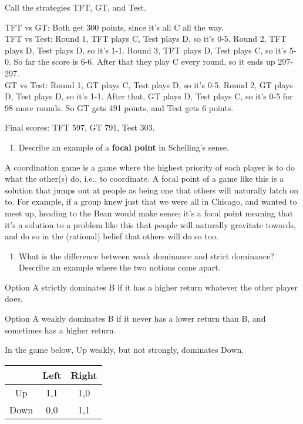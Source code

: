 \documentclass[
  12pt,
  letterpaper,
  DIV=11,
  numbers=noendperiod]{scrartcl}
\providecommand{\tightlist}{%
  \setlength{\itemsep}{0pt}\setlength{\parskip}{0pt}}\usepackage{longtable,booktabs,array}
\begin{document}
Call the strategies TFT, GT, and Test.

TFT vs GT: Both get 300 points, since it's all C all the way.\\
TFT vs Test: Round 1, TFT plays C, Test plays D, so it's 0-5. Round 2,
TFT plays D, Test plays D, so it's 1-1. Round 3, TFT plays D, Test plays
C, so it's 5-0. So far the score is 6-6. After that they play C every
round, so it ends up 297-297.\\
GT vs Test: Round 1, GT plays C, Test plays D, so it's 0-5. Round 2, GT
plays D, Test plays D, so it's 1-1. After that, GT plays D, Test plays
C, so it's 0-5 for 98 more rounds. So GT gets 491 points, and Test gets
6 points.

Final scores: TFT 597, GT 791, Test 303.

\begin{enumerate}
\def\labelenumi{\arabic{enumi}.}
\setcounter{enumi}{6}
\tightlist
\item
  Describe an example of a \textbf{focal point} in Schelling's sense.
\end{enumerate}

A coordination game is a game where the highest priority of each player
is to do what the other(s) do, i.e., to coordinate. A focal point of a
game like this is a solution that jumps out at people as being one that
others will naturally latch on to. For example, if a group knew just
that we were all in Chicago, and wanted to meet up, heading to the Bean
would make sense; it's a focal point meaning that it's a solution to a
problem like this that people will naturally gravitate towards, and do
so in the (rational) belief that others will do so too.

\begin{enumerate}
\def\labelenumi{\arabic{enumi}.}
\setcounter{enumi}{7}
\tightlist
\item
  What is the difference between weak dominance and strict dominance?
  Describe an example where the two notions come apart.
\end{enumerate}

Option A strictly dominates B if it has a higher return whatever the
other player does.

Option A weakly dominates B if it never has a lower return than B, and
sometimes has a higher return.

In the game below, Up weakly, but not strongly, dominates Down.

\begin{longtable}[]{@{}ccc@{}}
\toprule\noalign{}
& Left & Right \\
\midrule\noalign{}
\endhead
\bottomrule\noalign{}
\endlastfoot
Up & 1,1 & 1,0 \\
Down & 0,0 & 1,1 \\
\end{longtable}
\end{document}
